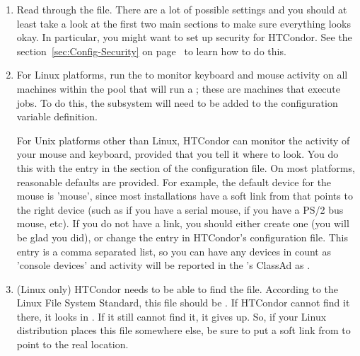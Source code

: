 \begin{enumerate}
\item Read through the  file.  There are a
    lot of possible settings and you should at least take a look at
    the first two main sections to make sure everything looks okay.
    In particular, you might want to set up security for
    HTCondor.  See the section~\ref{sec:Config-Security} on
    page~\pageref{sec:Config-Security} to learn how to do this.

\item For Linux platforms, run the  to monitor keyboard
    and mouse activity on all machines within the pool that will
    run a ; these are machines that execute jobs.
    To do this, the subsystem  will need to be added to
    the  configuration variable definition.

    For Unix platforms other than Linux,
    HTCondor can monitor the activity of your mouse and keyboard,
    provided that you tell it where to look.  You do this with the
     entry in the  section of
    the configuration file.  On most platforms, reasonable
    defaults are provided.
    For example, the default device for the mouse
    is 'mouse', since most installations have a soft link from
     that points to the right device (such as
     if you have a serial mouse,  if you have
    a PS/2 bus mouse, etc).  If you do not have a 
    link, you should either create one (you will be glad you did), or
    change the  entry in HTCondor's
    configuration file.
    This entry is a comma separated list, so you can have any
    devices in  count as 'console devices' and activity
    will be reported in the 's ClassAd as
    .

\item  (Linux only) HTCondor needs to be able to find the  file.
    According to the Linux File System Standard, this file should be
    .  If HTCondor cannot find it there, it looks in
    .  If it still cannot find it, it gives up.  So, if
    your Linux distribution places this file somewhere else, be sure to
    put a soft link from  to point to the real location.

\end{enumerate}


